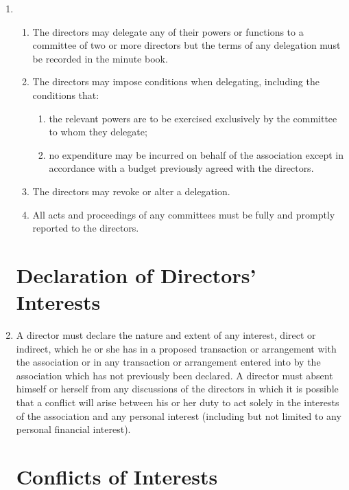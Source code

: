 \begin{enumerate}
\item
  \begin{enumerate}
  \item
    The directors may delegate any of their powers or functions to a
    committee of two or more directors but the terms of any delegation
    must be recorded in the minute book.
  \item
    The directors may impose conditions when delegating, including the
    conditions that:
    \begin{enumerate}
    \item
      the relevant powers are to be exercised exclusively by the
      committee to whom they delegate;
    \item
      no expenditure may be incurred on behalf of the association except in
      accordance with a budget previously agreed with the directors.
    \end{enumerate}
  \item
    The directors may revoke or alter a delegation.
  \item
    All acts and proceedings of any committees must be fully and
    promptly reported to the directors.
  \end{enumerate}

\section{Declaration of Directors' Interests}

\item \label{directors-interests}
  A director must declare the nature and extent of any interest,
  direct or indirect, which he or she has in a proposed transaction
  or arrangement with the association or in any transaction or
  arrangement entered into by the association which has not previously
  been declared. A director must absent himself or herself from any
  discussions of the directors in which it is possible that a
  conflict will arise between his or her duty to act solely in the
      interests of the association and any personal interest (including but
  not limited to any personal financial interest).

\section{Conflicts of Interests}


\end{enumerate}
